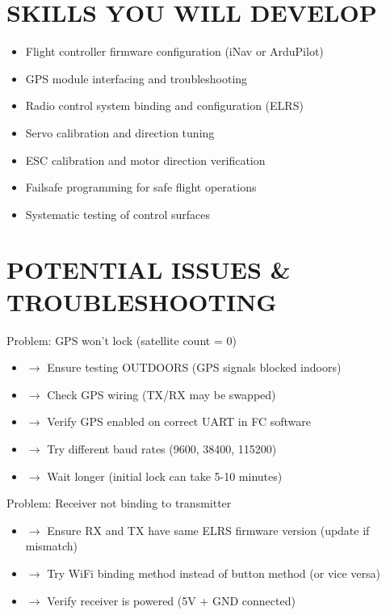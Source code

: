 \documentclass[11pt,letterpaper]{article}
\begin{document}
\section{SKILLS YOU WILL DEVELOP}

\begin{itemize}
  \item Flight controller firmware configuration (iNav or ArduPilot)
  \item GPS module interfacing and troubleshooting
  \item Radio control system binding and configuration (ELRS)
  \item Servo calibration and direction tuning
  \item ESC calibration and motor direction verification
  \item Failsafe programming for safe flight operations
  \item Systematic testing of control surfaces
\end{itemize}

\section{POTENTIAL ISSUES \& TROUBLESHOOTING}

Problem: GPS won't lock (satellite count = 0)\par

\begin{itemize}
  \item $\rightarrow$ Ensure testing OUTDOORS (GPS signals blocked indoors)
  \item $\rightarrow$ Check GPS wiring (TX/RX may be swapped)
  \item $\rightarrow$ Verify GPS enabled on correct UART in FC software
  \item $\rightarrow$ Try different baud rates (9600, 38400, 115200)
  \item $\rightarrow$ Wait longer (initial lock can take 5-10 minutes)
\end{itemize}

Problem: Receiver not binding to transmitter\par

\begin{itemize}
  \item $\rightarrow$ Ensure RX and TX have same ELRS firmware version (update if mismatch)
  \item $\rightarrow$ Try WiFi binding method instead of button method (or vice versa)
  \item $\rightarrow$ Verify receiver is powered (5V + GND connected)
\end{itemize}
\end{document}
